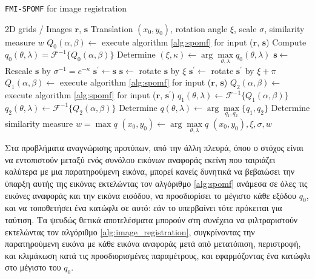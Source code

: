 \begin{algorithm}
  \renewcommand{\arraystretch}{1.3}
  \caption{\texttt{FMI-SPOMF} for image registration}
  \begin{spacing}{1.2}
  \begin{algorithmic}[1]
    \REQUIRE 2D grids / Images $\bm{r}$, $\bm{s}$
    \ENSURE Translation $(x_0,y_0)$, rotation angle $\xi$, scale $\sigma$, similarity measure $w$
    \STATE $Q_0(\alpha,\beta) \leftarrow$ execute algorithm \ref{alg:spomf} for input ($\bm{r}$, $\bm{s}$)
    \STATE Compute $q_0(\theta,\lambda) = \mathcal{F}^{-1}\{Q_0(\alpha, \beta)\}$
    \STATE Determine $(\xi, \kappa) \leftarrow \arg\max\limits_{\theta,\lambda}{q_0(\theta, \lambda)}$
    \STATE $\bm{s} \leftarrow$ Rescale $\bm{s}$ by $\sigma^{-1} = e^{-\kappa}$
    \STATE $\bm{s}^{\prime} \leftarrow \bm{s}$
    \STATE $\bm{s} \leftarrow$          rotate $\bm{s}$ by $\xi$
    \STATE $\bm{s}^{\prime} \leftarrow$ rotate $\bm{s}^{\prime}$ by $\xi + \pi$
    \STATE $Q_1(\alpha,\beta) \leftarrow$ execute algorithm \ref{alg:spomf} for input ($\bm{r}$, $\bm{s}$)
    \STATE $Q_2(\alpha,\beta) \leftarrow$ execute algorithm \ref{alg:spomf} for input ($\bm{r}$, $\bm{s}^{\prime}$)
    \STATE $q_1(\theta,\lambda) \leftarrow \mathcal{F}^{-1}\{Q_1(\alpha, \beta)\}$
    \STATE $q_2(\theta,\lambda) \leftarrow \mathcal{F}^{-1}\{Q_2(\alpha, \beta)\}$
    \STATE Determine $q(\theta,\lambda) \leftarrow \arg\max\limits_{q_1,q_2}\{q_1, q_2\}$
    \STATE Determine similarity measure $w = \max q$
    \STATE $(x_0,y_0) \leftarrow \arg\max\limits_{\theta,\lambda}{q}$
    \RETURN $(x_0,y_0), \xi, \sigma, w$
  \end{algorithmic}
  \end{spacing}
  \label{alg:image_registration}
\end{algorithm}

Στα προβλήματα αναγνώρισης προτύπων, από την άλλη πλευρά, όπου ο στόχος είναι
να εντοπιστούν μεταξύ ενός συνόλου εικόνων αναφοράς εκείνη που ταιριάζει
καλύτερα με μια παρατηρούμενη εικόνα, μπορεί κανείς δυνητικά να βεβαιώσει την
ύπαρξη αυτής της εικόνας εκτελώντας τον αλγόριθμο \ref{alg:spomf} ανάμεσα σε
όλες τις εικόνες αναφοράς και την εικόνα εισόδου, να προσδιορίσει το μέγιστο
κάθε εξόδου $q_0$, και να τοποθετήσει ένα κατώφλι σε αυτό: εάν το υπερβαίνει
τότε πρόκειται για ταύτιση. Τα ψευδώς θετικά αποτελέσματα μπορούν στη συνέχεια
να φιλτραριστούν εκτελώντας τον αλγόριθμο \ref{alg:image_registration},
συγκρίνοντας την παρατηρούμενη εικόνα με κάθε εικόνα αναφοράς μετά από
μετατόπιση, περιστροφή, και κλιμάκωση κατά τις προσδιορισμένες παραμέτρους, και
εφαρμόζοντας ένα κατώφλι στο μέγιστο του $q_0$.



